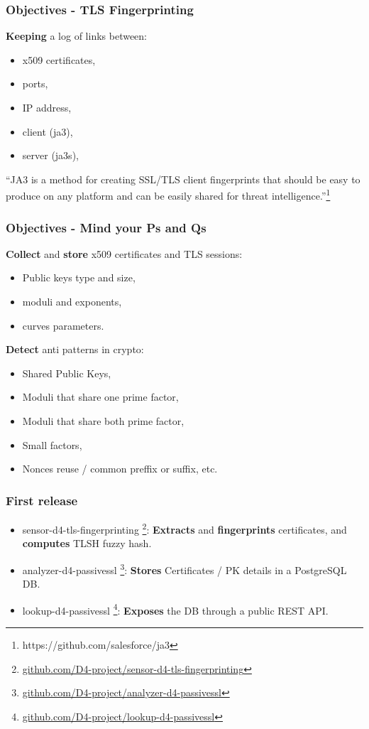 \documentclass{beamer}
\begin{document}
\begin{frame}
  \frametitle{Objectives - TLS Fingerprinting}
        {\bf Keeping} a log of links between:
        \begin{itemize}
          \item x509 certificates,
          \item ports,
          \item IP address,
          \item client (ja3),
          \item server (ja3s),
        \end{itemize}
        \begin{displayquote}
        ``JA3 is a method for creating SSL/TLS client fingerprints that should be easy to produce on any platform and can be easily shared for threat intelligence.''\footnote{https://github.com/salesforce/ja3}
        \end{displayquote}
\end{frame}

\begin{frame}
   \frametitle{Objectives - Mind your Ps and Qs}
   {\bf Collect} and {\bf store} x509 certificates and TLS sessions:
        \begin{itemize}
        \item Public keys type and size,
        \item moduli and exponents,
        \item curves parameters.
        \end{itemize}
        {\bf Detect} anti patterns in crypto:
        \begin{itemize}
          \item Shared Public Keys,
          \item Moduli that share one prime factor,
          \item Moduli that share both prime factor,
          \item Small factors,
          \item Nonces reuse / common preffix or suffix, etc. 
        \end{itemize}
        
\end{frame}

\begin{frame}
  \frametitle{First release}
  \begin{itemize}
  \item[\checkmark] sensor-d4-tls-fingerprinting
    \footnote{\url{github.com/D4-project/sensor-d4-tls-fingerprinting}}:
    {\bf Extracts} and {\bf fingerprints} certificates, and {\bf computes} TLSH fuzzy hash.
  \item[\checkmark] analyzer-d4-passivessl
    \footnote{\url{github.com/D4-project/analyzer-d4-passivessl}}:
    {\bf Stores} Certificates / PK details in a PostgreSQL DB.
  \item lookup-d4-passivessl
    \footnote{\url{github.com/D4-project/lookup-d4-passivessl}}:
    {\bf Exposes} the DB through a public REST API.
  \end{itemize}
\end{frame}
\end{document}
